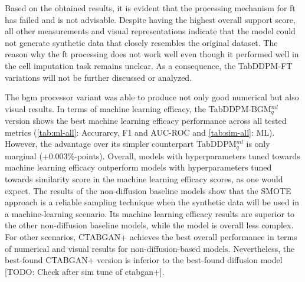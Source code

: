 
Based on the obtained results, it is evident that the processing mechanism for \gls{ft} has failed and is not advisable. 
Despite having the highest overall support score, all other measurements and visual representations indicate that the model could not generate synthetic data that closely resembles the original dataset.
The reason why the \gls{ft} processing does not work well even though it performed well in the cell imputation task \cite{zheng2022DiffusionModelsMissing} remains unclear.
As a consequence, the TabDDPM-FT variations will not be further discussed or analyzed.

The \gls{bgm} processor variant was able to produce not only good numerical but also visual results.
In terms of machine learning efficacy, the TabDDPM-BGM$^{ml}_q$ version shows the best machine learning efficacy performance across all tested metrics (\autoref{tab:ml-all}: Accurarcy, F1 and AUC-ROC and \autoref{tab:sim-all}: ML).
However, the advantage over its simpler counterpart TabDDPM$^{ml}_q$ is only marginal (+0.003\%-points).
Overall, models with hyperparameters tuned towards machine learning efficacy outperform models with hyperparameters tuned towards similarity score in the machine learning efficacy scores, as one would expect.
The results of the non-diffusion baseline models show that the SMOTE approach is a reliable sampling technique when the synthetic data will be used in a machine-learning scenario.
Its machine learning efficacy results are superior to the other non-diffusion baseline models, while the model is overall less complex.
For other scenarios, CTABGAN+ achieves the best overall performance in terms of numerical and visual results for non-diffusion-based models.
Nevertheless, the best-found CTABGAN+ version is inferior to the best-found diffusion model [TODO: Check after sim tune of ctabgan+].

